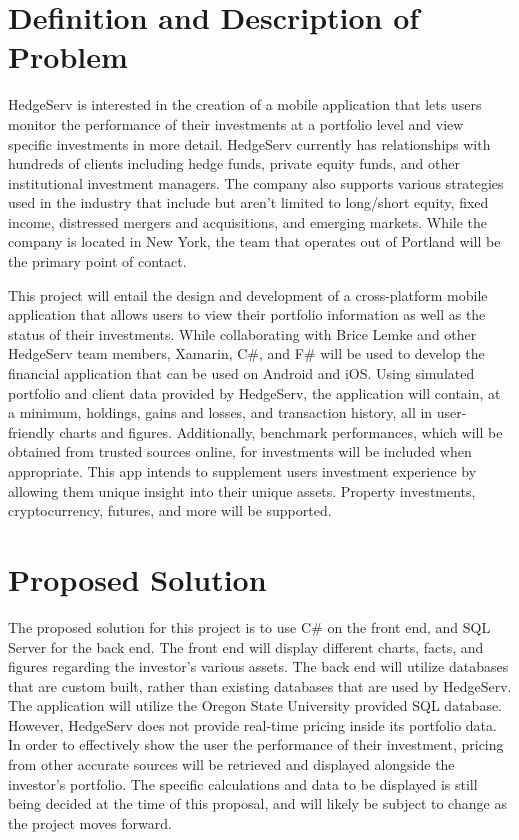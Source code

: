 \documentclass[onecolumn, draftclsnofoot,10pt, compsoc]{IEEEtran}
\begin{document}
\newpage
{}
\tableofcontents
\clearpage

\section{Definition and Description of Problem}

HedgeServ is interested in the creation of a mobile application that lets users monitor the performance of their investments at a portfolio level and view specific investments in more detail. HedgeServ currently has relationships with hundreds of clients including hedge funds, private equity funds, and other institutional investment managers. The company also supports various strategies used in the industry that include but aren’t limited to long/short equity, fixed income, distressed mergers and acquisitions, and emerging markets. While the company is located in New York, the team that operates out of Portland will be the primary point of contact.

This project will entail the design and development of a cross-platform mobile application that allows users to view their portfolio information as well as the status of their investments. While collaborating with Brice Lemke and other HedgeServ team members, Xamarin, C#, and F# will be used to develop the financial application that can be used on Android and iOS. Using simulated portfolio and client data provided by HedgeServ, the application will contain, at a minimum, holdings, gains and losses, and transaction history, all in user-friendly charts and figures. Additionally, benchmark performances, which will be obtained from trusted sources online, for investments will be included when appropriate. This app intends to supplement users investment experience by allowing them unique insight into their unique assets. Property investments, cryptocurrency, futures, and more will be supported.

\section{Proposed Solution}
The proposed solution for this project is to use C# on the front end, and SQL Server for the back end. The front end will display different charts, facts, and figures regarding the investor’s various assets. The back end will utilize databases that are custom built, rather than existing databases that are used by HedgeServ. The application will utilize the Oregon State University provided SQL database. However, HedgeServ does not provide real-time pricing inside its portfolio data. In order to effectively show the user the performance of their investment, pricing from other accurate sources will be retrieved and displayed alongside the investor’s portfolio. The specific calculations and data to be displayed is still being decided at the time of this proposal, and will likely be subject to change as the project moves forward.
\end{document}
